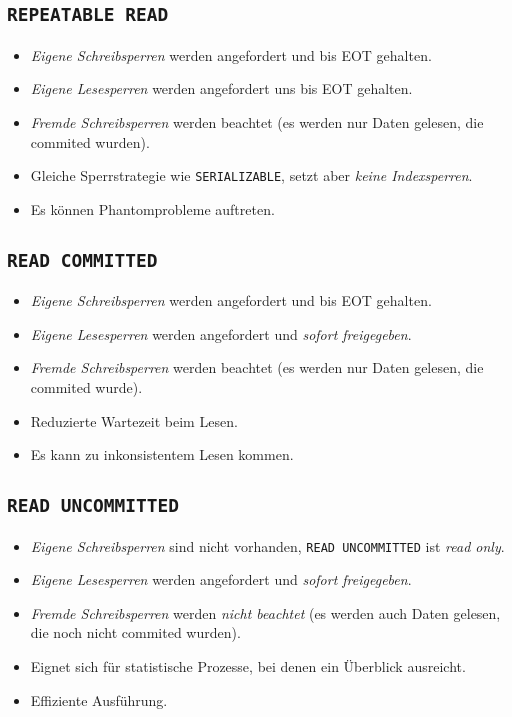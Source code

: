         \subsection{\lstinline|REPEATABLE READ|} %
            \begin{itemize}
            	\item \textit{Eigene Schreibsperren} werden angefordert und bis EOT gehalten.
            	\item \textit{Eigene Lesesperren} werden angefordert uns bis EOT gehalten.
            	\item \textit{Fremde Schreibsperren} werden beachtet (es werden nur Daten gelesen, die commited wurden).
            	\item Gleiche Sperrstrategie wie \lstinline|SERIALIZABLE|, setzt aber \textit{keine Indexsperren}.
            	\item Es können Phantomprobleme auftreten.
            \end{itemize}

        \subsection{\lstinline|READ COMMITTED|} %
            \begin{itemize}
            	\item \textit{Eigene Schreibsperren} werden angefordert und bis EOT gehalten.
            	\item \textit{Eigene Lesesperren} werden angefordert und \textit{sofort freigegeben}.
            	\item \textit{Fremde Schreibsperren} werden beachtet (es werden nur Daten gelesen, die commited wurde).
            	\item Reduzierte Wartezeit beim Lesen.
            	\item Es kann zu inkonsistentem Lesen kommen.
            \end{itemize}

        \subsection{\lstinline|READ UNCOMMITTED|} %
            \begin{itemize}
            	\item \textit{Eigene Schreibsperren} sind nicht vorhanden, \lstinline|READ UNCOMMITTED| ist \textit{read only}.
            	\item \textit{Eigene Lesesperren} werden angefordert und \textit{sofort freigegeben}.
            	\item \textit{Fremde Schreibsperren} werden \textit{nicht beachtet} (es werden auch Daten gelesen, die noch nicht commited wurden).
            	\item Eignet sich für statistische Prozesse, bei denen ein Überblick ausreicht.
            	\item Effiziente Ausführung.
            \end{itemize}
        
